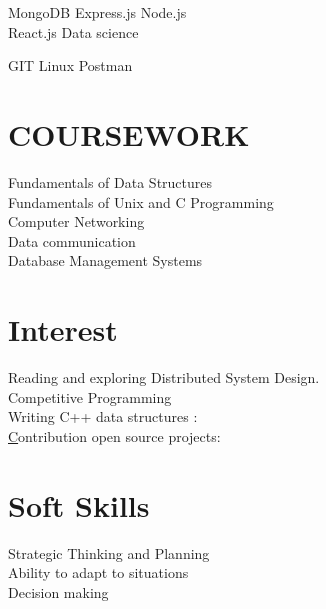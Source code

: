 \documentclass[]{deedy-resume-openfont}
\begin{document}
\begin{minipage}[t]{0.33\textwidth}
 \textbullet{} MongoDB 
\textbullet{}Express.js \textbullet{} Node.js \\
\textbullet{} React.js
 \textbullet{} Data science
 
 \textbullet{} GIT \textbullet{}Linux \textbullet{}Postman
\sectionsep


\section{COURSEWORK}
\textbullet{}Fundamentals of Data Structures\\
\textbullet{}Fundamentals of Unix and C
 Programming \\
\textbullet{}Computer Networking\\
\textbullet{}Data communication \\
\textbullet{}Database Management Systems\\



\section{Interest}
\textbullet{}Reading and exploring Distributed System Design.\\
\textbullet{}Competitive Programming\\
\textbullet{}Writing C++ data structures : \href{https://github.com/llucifer97/Algorithms-Datastructure}{}\\
\textbullet{}\href{}Contribution open source projects: \href{https://github.com/pulls?q=is%3Apr+author%3Allucifer97+archived%3Afalse+is%3Aclosed}{\custombold{Link}}\\



 \section{Soft Skills}
 \textbullet{}Strategic Thinking and Planning\\
\textbullet{}Ability to adapt to situations\\
 \textbullet{}Decision making
 \sectionsep
%
%

\end{minipage} 
\end{document}
